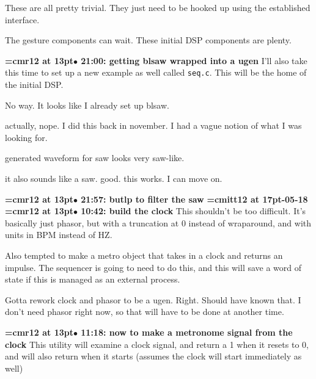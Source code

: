 These are all pretty trivial. They just need to be hooked up using the established interface.
\par

The gesture components can wait. These initial DSP components are plenty.
\par

{\smallskip\noindent\bf\font\titlefont=cmr12 at 13pt\titlefont $\bullet$ 21:00: getting blsaw wrapped into a ugen}\smallskip
I'll also take this time to set up a new example as well called {\tt seq.c}. This will be the home of the initial DSP.
\par

No way. It looks like I already set up blsaw.
\par

actually, nope. I did this back in november. I had a vague notion of what I was looking for.
\par

generated waveform for saw looks very saw-like.
\par

it also sounds like a saw. good. this works. I can move on.
\par

{\smallskip\noindent\bf\font\titlefont=cmr12 at 13pt\titlefont $\bullet$ 21:57: butlp to filter the saw}\smallskip
{\medskip\noindent\bf\font\titlefont=cmitt12 at 17pt-05-18}\medskip
{\smallskip\noindent\bf\font\titlefont=cmr12 at 13pt\titlefont $\bullet$ 10:42: build the clock}\smallskip
This shouldn't be too difficult. It's basically just phasor, but with a truncation at 0 instead of wraparound, and with units in BPM instead of HZ.
\par

Also tempted to make a metro object that takes in a clock and returns an impulse. The sequencer is going to need to do this, and this will save a word of state if this is managed as an external process.
\par

Gotta rework clock and phasor to be a ugen. Right. Should have known that. I don't need phasor right now, so that will have to be done at another time.
\par

{\smallskip\noindent\bf\font\titlefont=cmr12 at 13pt\titlefont $\bullet$ 11:18: now to make a metronome signal from the clock}\smallskip
This utility will examine a clock signal, and return a 1 when it resets to 0, and will also return when it starts (assumes the clock will start immediately as well)
\par

